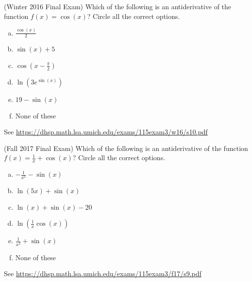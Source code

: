 \documentclass[11pt]{exam}
\begin{document}
\begin{questions}
\vspace{-0.3cm}
\question (Winter 2016 Final Exam) %
Which of the following is an antiderivative of the function $f(x)= \cos(x)$? Circle all the correct options.
\begin{multicols}{3}
\begin{enumerate}[(a)]
	\item $\frac{\cos(x)}{2}$
	\item $\sin(x) + 5$
	\item $\cos \left( x - \frac{\pi}{2} \right)$
	\item $\ln \left( 3e^{\sin(x)} \right)$
	\item $19- \sin(x)$
	\item None of these
\end{enumerate}
\end{multicols}
\begin{solution}
 See \href{https://dhsp.math.lsa.umich.edu/exams/115exam3/w16/s10.pdf}{https://dhsp.math.lsa.umich.edu/exams/115exam3/w16/s10.pdf}
\end{solution}
\vspace{-0.3cm}
\question (Fall 2017 Final Exam) %
Which of the following is an antiderivative of the function $f(x)= \frac{1}{x} + \cos(x)$? Circle all the correct options.
\begin{multicols}{3}
\begin{enumerate}[(a)]
	\item $-\frac{1}{x^2} - \sin(x)$
	\item $\ln(5x)+ \sin(x)$
	\item $\ln(x) + \sin(x) - 20$
	\item $\ln \left( \frac{1}{x} \cos(x) \right)$
	\item $\frac{1}{x^2} + \sin(x)$
	\item None of these
\end{enumerate}
\end{multicols}
\begin{solution}
  See \href{https://dhsp.math.lsa.umich.edu/exams/115exam3/f17/s9.pdf}{https://dhsp.math.lsa.umich.edu/exams/115exam3/f17/s9.pdf}
\end{solution}
\end{questions}
\end{document}
